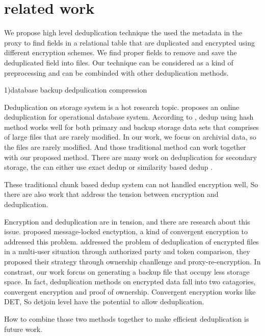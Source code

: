 \section{related work}

We propose high level deduplication technique the used the metadata in the proxy to find fields in a relational table that are duplicated and encrypted using different encryption schemes. We find proper fields to remove and save the deduplicated field into files. Our technique can be considered as a kind of preprocessing and can be combinded with other deduplication methods.


1)database backup dedpulication compression

Deduplication on storage system is a hot research topic\citep{paulo2014survey}.\citep{xu2017online} proposes an online deduplication for operational database system. According to \citep{xu2017online}, dedup using hash method works well for both primary and backup storage data sets that comprises of large files that are rarely modified. In our work, we focus on archivial data, so the files are rarely modified. And those traditional method can work together with our proposed method. There are many work on deduplication for secondary storage, the can either use exact dedup\citep{dubnicki2009hydrastor} or similarity based dedup\citep{xu2015reducing} \citep{aronovich2009design}\citep{you2005deep}.

These traditional chunk based dedup system can not handled encryption well, So there are also work that address the tension between encryption and deduplication. 

Encryption and deduplication are in tension, and there are research about this issue.\citep{bellare2013message} \citep{puzio2015perfectdedup} proposed message-locked enctyption, a kind of convergent encryption to addressed this problem. \citep{yan2016deduplication} addressed the problem of deduplication of encrypted files in a multi-user situation through authorized party and token comparison, they proposed their strategy through ownership chanllenge and proxy-re-encryption. In constrast, our work forcus on generating a backup file that occupy less storage space. In fact, deduplication methods on encrypted data fall into two catagories, convergent encryption and proof of ownership\citep{akhila2016study}. Convergent encryption works like DET, So detjoin level have the potential to allow deduplication.

How to combine those two methods together to make efficient deduplication is future work.

